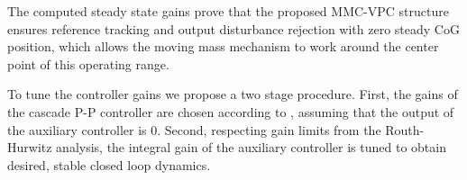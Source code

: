 The computed steady state gains prove that the proposed MMC-VPC structure ensures reference tracking and output disturbance rejection with zero steady CoG position, which allows the moving mass mechanism to work around the center point of this operating range. %

To tune the controller gains we propose a two stage procedure. First, the gains of the cascade P-P controller are chosen according to \cite{Haus2017}, assuming that the output of the auxiliary controller is 0. Second, respecting gain limits from the Routh-Hurwitz analysis, the integral gain of the auxiliary controller is tuned to obtain desired, stable closed loop dynamics.